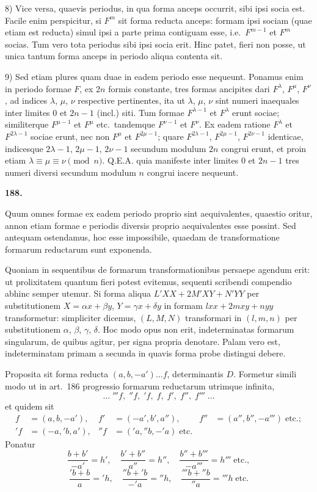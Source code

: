 \documentclass[12pt,a4paper]{article}
\theoremstyle{plain}
\begin{document}
8) Vice versa, quaevis periodus, in qua forma anceps occurrit, sibi ipsi socia est. Facile enim perspicitur, si $F^m$ sit forma reducta anceps: formam ipsi sociam (quae etiam est reducta) simul ipsi a parte prima contiguam esse, i.e.~$F^{m-1}$ et $F^m$ socias. Tum vero tota periodus sibi ipsi socia erit. Hinc patet, fieri non posse, ut unica tantum forma anceps in periodo aliqua contenta sit.

9) Sed etiam plures quam duae in eadem periodo esse nequeunt. Ponamus enim in periodo formae $F$, ex $2n$ formis constante, tres formas ancipites dari $F^\lambda$, $F^\mu$, $F^\nu$, ad indices $\lambda$, $\mu$, $\nu$ respective pertinentes, ita ut $\lambda$, $\mu$, $\nu$ sint numeri inaequales inter limites $0$ et $2n - 1$ (incl.) siti. Tum formae $F^{\lambda-1}$ et $F^\lambda$ erunt sociae; similiterque $F^{\mu-1}$ et $F^\mu$ etc.~tandemque $F^{\nu-1}$ et $F^\nu$. Ex eadem ratione $F^\lambda$ et $F^{2\lambda-1}$ sociae erunt, nec non $F^\mu$ et $F^{2\mu-1}$; quare $F^{2\lambda-1}$, $F^{2\mu-1}$, $F^{2\nu-1}$ identicae, indicesque $2\lambda - 1$, $2\mu - 1$, $2\nu - 1$ secundum modulum $2n$ congrui erunt, et proin etiam $\lambda \equiv \mu \equiv \nu \pmod{n}$. Q.E.A. quia manifeste inter limites $0$ et $2n - 1$ tres numeri diversi secundum modulum $n$ congrui iacere nequeunt.

\bigskip

\textbf{188.}

Quum omnes formae ex eadem periodo proprio sint aequivalentes, quaestio oritur, annon etiam formae e periodis diversis proprio aequivalentes esse possint. Sed antequam ostendamus, hoc esse impossibile, quaedam de transformatione formarum reductarum sunt exponenda.

Quoniam in sequentibus de formarum transformationibus persaepe agendum erit: ut prolixitatem quantum fieri potest evitemus, sequenti scribendi compendio abhinc semper utemur. Si forma aliqua $L'XX + 2M'XY + N'YY$ per substitutionem $X = \alpha x + \beta y$, $Y = \gamma x + \delta y$ in formam $lxx + 2mxy + nyy$ transformetur: simpliciter dicemus, $(L, M, N)$ transformari in $(l, m, n)$ per substitutionem $\alpha$, $\beta$, $\gamma$, $\delta$. Hoc modo opus non erit, indeterminatas formarum singularum, de quibus agitur, per signa propria denotare. Palam vero est, indeterminatam primam a secunda in quavis forma probe distingui debere.

Proposita sit forma reducta $(a, b, -a')\ldots f$, determinantis $D$. Formetur simili modo ut in art.~186 progressio formarum reductarum utrimque infinita,
\[
\ldots \; '''f, \; ''f, \; 'f, \; f, \; f', \; f'', \; f''' \; \ldots
\]
et quidem sit
\[
\begin{aligned}
f &= (a, b, -a'), & f' &= (-a', b', a''), & f'' &= (a'', b'', -a''') \; \text{etc.};\\
'f &= (-a, 'b, a'), & ''f &= ('a, ''b, -'a) \; \text{etc.}
\end{aligned}
\]
Ponatur
\[
\frac{b + b'}{-a'} = h', \quad \frac{b' + b''}{a''} = h'', \quad \frac{b'' + b'''}{-a'''} = h''' \; \text{etc.},
\]
\[
\frac{'b + b}{a} = 'h, \quad \frac{''b + 'b}{-'a} = ''h, \quad \frac{'''b + ''b}{''a} = '''h \; \text{etc.}
\]
\end{document}
